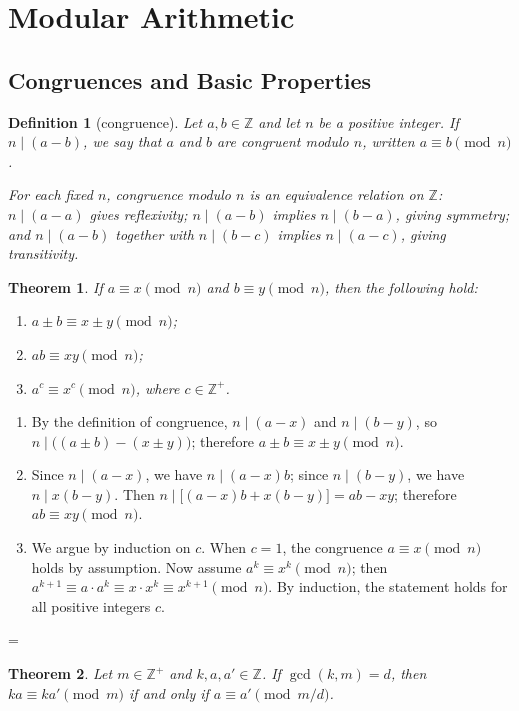 \documentclass[11pt]{article}
\makeatletter
\theoremstyle{ntstyle}
\newtheorem{theorem}{Theorem}[subsection]
\newtheorem{definition}{Definition}[subsection]
\let\nt@closedisplay\]
\def\nt@guardedclose{\@ifnextchar\par{\nt@closeafterpar}{\@ifnextchar\end{\postdisplaypenalty\@M\nt@closedisplay}{\nt@closedisplay}}}
\def\nt@closeafterpar\par{\@ifnextchar\par{\nt@closeafterpar}{\@ifnextchar\end{\postdisplaypenalty\@M\nt@closedisplay\par}{\nt@closedisplay\par}}}
\renewenvironment{proof}[1][\proofname]{\par
  \pushQED{\qed}\normalfont\topsep\medskipamount\edef\nt@afterproof{\@endparpenalty=\the\@endparpenalty\relax}\@beginparpenalty\@M\@endparpenalty\@M\let\]\nt@guardedclose\trivlist\item[]\textit{#1\@addpunct{.}} \ignorespaces}{\ifvmode\addpenalty\@M\fi\popQED\nt@afterproof\endtrivlist\@endpefalse}
\makeatother
\begin{document}
\section{Modular Arithmetic}

\subsection{Congruences and Basic Properties}

\begin{definition}[congruence]\label{def:3.1.1} Let $a, b \in \mathbb{Z}$ and let $n$ be a
	positive integer. If $n \mid (a - b)$, we say that $a$ and $b$ are congruent modulo $n$, written $a \equiv b \pmod{n}$.

	For each fixed $n$, congruence modulo $n$ is an equivalence relation on
	$\mathbb{Z}$: $n\mid(a-a)$ gives reflexivity; $n\mid(a-b)$ implies
	$n\mid(b-a)$, giving symmetry; and $n\mid(a-b)$ together with
	$n\mid(b-c)$ implies $n\mid(a-c)$, giving transitivity.

\end{definition}
\begin{theorem}\label{thm:3.1.1} If $a \equiv x \pmod{n}$ and $b
		\equiv y \pmod{n}$, then the following hold:

	\begin{enumerate}[label={\alph*)}]
		\item $a \pm b \equiv x \pm y \pmod{n}$;
		\item $ab \equiv xy \pmod{n}$;
		\item $a^{c} \equiv x^{c} \pmod{n}$, where $c \in \mathbb{Z}^+$.
	\end{enumerate}

\end{theorem}

\begin{proof}

	\begin{enumerate}[label={\alph*)}]
		\item By the definition of congruence, $n \mid (a - x)$ and $n \mid (b
			      - y)$, so $n \mid \big((a \pm b) - (x \pm y)\big)$; therefore $a \pm
			      b \equiv x \pm y \pmod{n}$.
		\item Since $n \mid (a-x)$, we have $n \mid (a-x)b$; since $n \mid (b - y)$, we have $n
			      \mid x(b-y)$. Then $n \mid \big[(a-x)b + x(b-y)\big] = ab - xy$;
		      therefore $ab \equiv xy \pmod{n}$.
		\item We argue by induction on $c$. When $c = 1$, the congruence $a
			      \equiv x \pmod{n}$ holds by assumption. Now assume $a^{k}
			      \equiv x^{k} \pmod{n}$; then $a^{k+1} \equiv a \cdot a^{k} \equiv x
			      \cdot x^{k} \equiv x^{k+1} \pmod{n}$. By induction, the statement
		      holds for all positive integers $c$.
	\end{enumerate}

\end{proof}
\begin{theorem}\label{thm:3.1.2} Let $m \in \mathbb{Z}^+$ and $k,
		a, a' \in \mathbb{Z}$. If $\gcd(k, m) = d$, then $ka
		\equiv ka' \pmod{m}$ if and only if $a \equiv a' \pmod{m/d}$.

\end{theorem}
\end{document}
